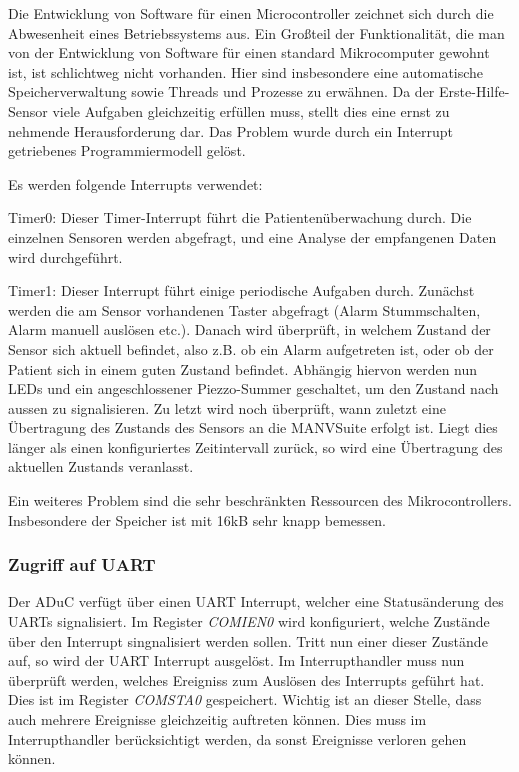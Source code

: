 Die Entwicklung von Software für einen Microcontroller zeichnet sich durch die Abwesenheit eines Betriebssystems 
aus. Ein Großteil der Funktionalität, die man von der Entwicklung von Software für einen standard Mikrocomputer 
gewohnt ist, ist schlichtweg nicht vorhanden. Hier sind insbesondere eine automatische Speicherverwaltung sowie
Threads und Prozesse zu erwähnen. Da der Erste-Hilfe-Sensor viele Aufgaben gleichzeitig erfüllen muss, stellt 
dies eine ernst zu nehmende Herausforderung dar. Das Problem wurde durch ein Interrupt getriebenes Programmiermodell
gelöst.

Es werden folgende Interrupts verwendet:

Timer0: Dieser Timer-Interrupt führt die Patientenüberwachung durch. Die einzelnen Sensoren werden abgefragt,
und eine Analyse der empfangenen Daten wird durchgeführt.

Timer1: Dieser Interrupt führt einige periodische Aufgaben durch. Zunächst werden die am Sensor vorhandenen
Taster abgefragt (Alarm Stummschalten, Alarm manuell auslösen etc.). Danach wird überprüft, in welchem Zustand
der Sensor sich aktuell befindet, also z.B. ob ein Alarm aufgetreten ist, oder ob der Patient sich in einem
guten Zustand befindet. Abhängig hiervon werden nun LEDs und ein angeschlossener Piezzo-Summer geschaltet,
um den Zustand nach aussen zu signalisieren. Zu letzt wird noch überprüft, wann zuletzt eine Übertragung
des Zustands des Sensors an die MANVSuite erfolgt ist. Liegt dies länger als einen konfiguriertes Zeitintervall
zurück, so wird eine Übertragung des aktuellen Zustands veranlasst.

Ein weiteres Problem sind die sehr beschränkten Ressourcen des Mikrocontrollers. Insbesondere der Speicher ist
mit 16kB sehr knapp bemessen. 


\subsubsection{Zugriff auf UART}
Der ADuC verfügt über einen UART Interrupt, welcher eine Statusänderung des UARTs signalisiert. Im Register 
\textsl{COMIEN0} wird konfiguriert, welche Zustände über den Interrupt singnalisiert werden sollen. Tritt
nun einer dieser Zustände auf, so wird der UART Interrupt ausgelöst. Im Interrupthandler muss nun überprüft
werden, welches Ereigniss zum Auslösen des Interrupts geführt hat. Dies ist im Register \textsl{COMSTA0} 
gespeichert. Wichtig ist an dieser Stelle, dass auch mehrere Ereignisse gleichzeitig auftreten können. 
Dies muss im Interrupthandler berücksichtigt werden, da sonst Ereignisse verloren gehen können.

